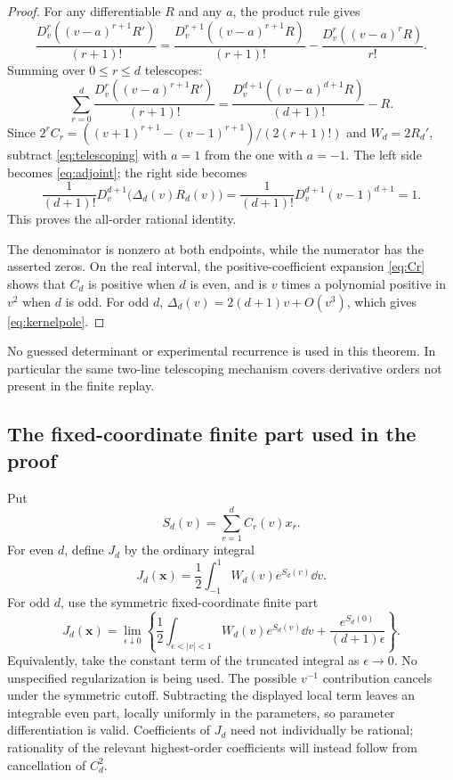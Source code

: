 \begin{proof}
For any differentiable $R$ and any $a$, the product rule gives
\[
 \frac{D_v^r((v-a)^{r+1}R')}{(r+1)!}
 =\frac{D_v^{r+1}((v-a)^{r+1}R)}{(r+1)!}
  -\frac{D_v^r((v-a)^rR)}{r!}.
\]
Summing over $0\le r\le d$ telescopes:
\begin{equation}\label{eq:telescoping}
 \sum_{r=0}^d\frac{D_v^r((v-a)^{r+1}R')}{(r+1)!}
 =\frac{D_v^{d+1}((v-a)^{d+1}R)}{(d+1)!}-R.
\end{equation}
Since $2^rC_r=((v+1)^{r+1}-(v-1)^{r+1})/(2(r+1)!)$ and $W_d=2R_d'$, subtract \eqref{eq:telescoping} with $a=1$ from the one with $a=-1$. The left side becomes \eqref{eq:adjoint}; the right side becomes
\[
 \frac1{(d+1)!}D_v^{d+1}\bigl(\Delta_d(v)R_d(v)\bigr)
 =\frac1{(d+1)!}D_v^{d+1}(v-1)^{d+1}=1.
\]
This proves the all-order rational identity.

The denominator is nonzero at both endpoints, while the numerator has the asserted zeros. On the real interval, the positive-coefficient expansion \eqref{eq:Cr} shows that $C_d$ is positive when $d$ is even, and is $v$ times a polynomial positive in $v^2$ when $d$ is odd. For odd $d$, $\Delta_d(v)=2(d+1)v+O(v^3)$, which gives \eqref{eq:kernelpole}.
\end{proof}

No guessed determinant or experimental recurrence is used in this theorem. In particular the same two-line telescoping mechanism covers derivative orders not present in the finite replay.

\subsection{The fixed-coordinate finite part used in the proof}

Put
\[
 S_d(v)=\sum_{r=1}^d C_r(v)x_r.
\]
For even $d$, define $J_d$ by the ordinary integral
\[
 J_d(\boldsymbol x)=\frac12\int_{-1}^1W_d(v)e^{S_d(v)}\dd v.
\]
For odd $d$, use the symmetric fixed-coordinate finite part
\begin{equation}\label{eq:JFP}
 J_d(\boldsymbol x)=\lim_{\epsilon\downarrow0}
 \left\{\frac12\int_{\epsilon<|v|<1}W_d(v)e^{S_d(v)}\dd v
       +\frac{e^{S_d(0)}}{(d+1)\epsilon}\right\}.
\end{equation}
Equivalently, take the constant term of the truncated integral as $\epsilon\to0$. No unspecified regularization is being used. The possible $v^{-1}$ contribution cancels under the symmetric cutoff. Subtracting the displayed local term leaves an integrable even part, locally uniformly in the parameters, so parameter differentiation is valid. Coefficients of $J_d$ need not individually be rational; rationality of the relevant highest-order coefficients will instead follow from cancellation of $C_d^2$.

